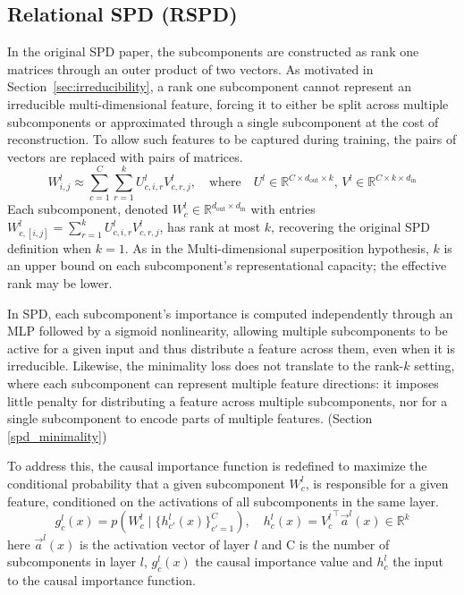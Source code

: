 \documentclass{article}
\begin{document}
\subsection{Relational SPD (RSPD)}
\label{sec:rank-k-attention}
In the original SPD paper, the subcomponents are constructed as rank one matrices
through an outer product of two vectors. As motivated in
Section~\ref{sec:irreducibility}, a rank one subcomponent cannot
represent an irreducible multi-dimensional feature, forcing it to either
be split across multiple subcomponents or approximated through a single subcomponent at
the cost of reconstruction. To allow such features to be captured during training,
the pairs of vectors are replaced with pairs of matrices.
\begin{equation}
W^{l}_{i,j} \approx \sum_{c=1}^{C} \sum_{r=1}^{k} U^{l}_{c,i,r} V^{l}_{c,r,j},
\quad \text{where} \quad U^l \in \mathbb{R}^{C \times d_{\text{out}} \times k}, \, V^l \in \mathbb{R}^{C \times k \times  d_{\text{in}}}
\end{equation}
Each subcomponent, denoted $W^{l}_{c} \in \mathbb{R}^{d_{\text{out}} \times d_{\text{in}}}$
with entries $W^{l}_{c,[i,j]} = \sum_{r=1}^{k} U^{l}_{c,i,r} V^{l}_{c,r,j}$, has rank
at most $k$, recovering the original SPD definition when $k=1$. As in the
Multi-dimensional superposition hypothesis, $k$ is an upper bound on each
subcomponent's representational capacity; the effective rank may be lower.

In SPD, each subcomponent's importance is computed independently through an MLP followed by a sigmoid nonlinearity,
allowing multiple subcomponents to be active for a given input and thus distribute a
feature across them, even when it is irreducible. Likewise, the minimality loss does not translate to the rank-$k$ setting, where each subcomponent can represent multiple feature directions:
it imposes little penalty for distributing a feature across multiple subcomponents,
nor for a single subcomponent to encode parts of multiple features. (Section \ref{spd_minimality})

To address this, the causal importance function is redefined to maximize the conditional probability that a given subcomponent $W^{l}_{c}$, is responsible for a given feature, conditioned on the activations of all subcomponents in the same layer.
\begin{equation}
    g^l_{c}(x) = p\!\left(W^l_c \mid \{h^l_{c'}(x)\}^{C}_{c'=1}\right), \quad h^l_c(x) = {V^l_c}^{\top} \vec{a}^l(x) \in \mathbb{R}^k
\end{equation}
here $\vec{a}^l(x)$ is the activation vector of layer $l$ and C is the number of subcomponents in layer $l$, $g^{l}_{c}(x)$ the causal importance value and $h_{c}^l$ the input to the causal importance function.
\end{document}
